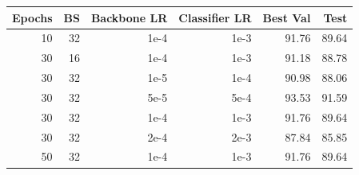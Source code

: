 \begin{tabular}{rrrrrr}
\toprule
Epochs & BS & Backbone LR & Classifier LR & Best Val & Test \\
\midrule
10 & 32 & 1e-4 & 1e-3 & 91.76 & 89.64 \\
30 & 16 & 1e-4 & 1e-3 & 91.18 & 88.78 \\
30 & 32 & 1e-5 & 1e-4 & 90.98 & 88.06 \\
30 & 32 & 5e-5 & 5e-4 & 93.53 & 91.59 \\
30 & 32 & 1e-4 & 1e-3 & 91.76 & 89.64 \\
30 & 32 & 2e-4 & 2e-3 & 87.84 & 85.85 \\
50 & 32 & 1e-4 & 1e-3 & 91.76 & 89.64 \\
\bottomrule
\end{tabular}
